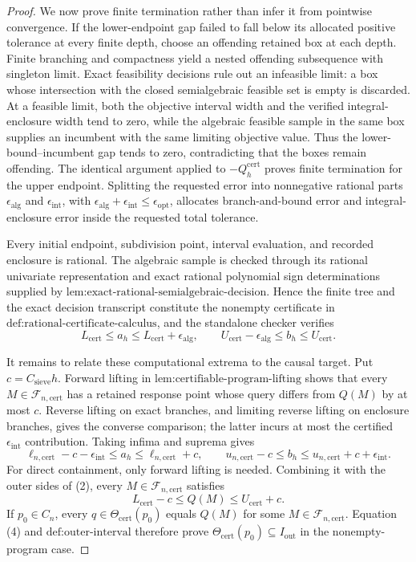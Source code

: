 \documentclass{article}
\begin{document}
\begin{proof}
We now prove finite termination rather than infer it from pointwise convergence.  If the lower-endpoint gap failed to fall below its allocated positive tolerance at every finite depth, choose an offending retained box at each depth.  Finite branching and compactness yield a nested offending subsequence with singleton limit.  Exact feasibility decisions rule out an infeasible limit: a box whose intersection with the closed semialgebraic feasible set is empty is discarded.  At a feasible limit, both the objective interval width and the verified integral-enclosure width tend to zero, while the algebraic feasible sample in the same box supplies an incumbent with the same limiting objective value.  Thus the lower-bound--incumbent gap tends to zero, contradicting that the boxes remain offending.  The identical argument applied to \(-Q_h^{\mathrm{cert}}\) proves finite termination for the upper endpoint.  Splitting the requested error into nonnegative rational parts \(\epsilon_{\mathrm{alg}}\) and \(\epsilon_{\mathrm{int}}\), with \(\epsilon_{\mathrm{alg}}+\epsilon_{\mathrm{int}}\leq\epsilon_{\mathrm{opt}}\), allocates branch-and-bound error and integral-enclosure error inside the requested total tolerance.

Every initial endpoint, subdivision point, interval evaluation, and recorded enclosure is rational.  The algebraic sample is checked through its rational univariate representation and exact rational polynomial sign determinations supplied by \(\text{lem:exact-rational-semialgebraic-decision}\).  Hence the finite tree and the exact decision transcript constitute the nonempty certificate in \(\text{def:rational-certificate-calculus}\), and the standalone checker verifies
\[
L_{\mathrm{cert}}\leq a_h\leq L_{\mathrm{cert}}+\epsilon_{\mathrm{alg}},
\qquad
U_{\mathrm{cert}}-\epsilon_{\mathrm{alg}}\leq b_h\leq U_{\mathrm{cert}}. \tag{2}
\]

It remains to relate these computational extrema to the causal target.  Put \(c=C_{\mathrm{sieve}}h\).  Forward lifting in \(\text{lem:certifiable-program-lifting}\) shows that every \(M\in\mathcal F_{n,\mathrm{cert}}\) has a retained response point whose query differs from \(Q(M)\) by at most \(c\).  Reverse lifting on exact branches, and limiting reverse lifting on enclosure branches, gives the converse comparison; the latter incurs at most the certified \(\epsilon_{\mathrm{int}}\) contribution.  Taking infima and suprema gives
\[
\ell_{n,\mathrm{cert}}-c-\epsilon_{\mathrm{int}}
\leq a_h\leq\ell_{n,\mathrm{cert}}+c,
\qquad
u_{n,\mathrm{cert}}-c
\leq b_h\leq u_{n,\mathrm{cert}}+c+\epsilon_{\mathrm{int}}. \tag{3}
\]
For direct containment, only forward lifting is needed.  Combining it with the outer sides of (2), every \(M\in\mathcal F_{n,\mathrm{cert}}\) satisfies
\[
L_{\mathrm{cert}}-c\leq Q(M)\leq U_{\mathrm{cert}}+c. \tag{4}
\]
If \(p_0\in C_n\), every \(q\in\Theta_{\mathrm{cert}}(p_0)\) equals \(Q(M)\) for some \(M\in\mathcal F_{n,\mathrm{cert}}\).  Equation (4) and \(\text{def:outer-interval}\) therefore prove \(\Theta_{\mathrm{cert}}(p_0)\subseteq I_{\mathrm{out}}\) in the nonempty-program case.


\end{proof}
\end{document}
